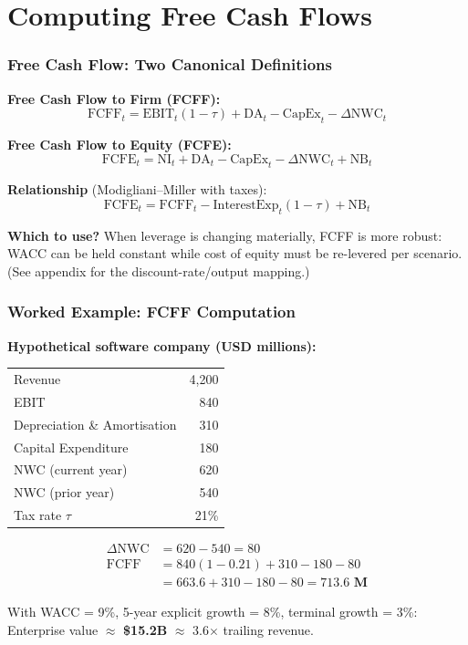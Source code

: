 \documentclass[9pt,t]{beamer}
\begin{document}
\section{Computing Free Cash Flows}

\begin{frame}
\frametitle{Free Cash Flow: Two Canonical Definitions}

\begin{underhood}
\textbf{Free Cash Flow to Firm (FCFF):}
\[
  \text{FCFF}_t = \text{EBIT}_t(1-\tau) + \text{DA}_t - \text{CapEx}_t - \Delta\text{NWC}_t
\]

\textbf{Free Cash Flow to Equity (FCFE):}
\[
  \text{FCFE}_t = \text{NI}_t + \text{DA}_t - \text{CapEx}_t - \Delta\text{NWC}_t + \text{NB}_t
\]

\textbf{Relationship} (Modigliani--Miller with taxes):
\[
  \text{FCFE}_t = \text{FCFF}_t - \text{InterestExp}_t(1-\tau) + \text{NB}_t
\]
\end{underhood}

\smallskip
\textbf{Which to use?} When leverage is changing materially, FCFF is more robust:
WACC can be held constant while cost of equity must be re-levered per scenario.
(See appendix for the discount-rate/output mapping.)
\end{frame}

\begin{frame}
\frametitle{Worked Example: FCFF Computation}

\textbf{Hypothetical software company (USD millions):}
\begin{center}
\begin{tabular}{lr}
\toprule
Revenue & 4{,}200 \\
EBIT & 840 \\
Depreciation \& Amortisation & 310 \\
Capital Expenditure & 180 \\
NWC (current year) & 620 \\
NWC (prior year) & 540 \\
Tax rate $\tau$ & 21\% \\
\bottomrule
\end{tabular}
\end{center}

\medskip
\begin{align*}
  \Delta\text{NWC} &= 620 - 540 = 80 \\
  \text{FCFF} &= 840(1-0.21) + 310 - 180 - 80 \\
              &= 663.6 + 310 - 180 - 80 = \mathbf{713.6\text{ M}}
\end{align*}

With WACC = 9\%, 5-year explicit growth = 8\%, terminal growth = 3\%:
Enterprise value $\approx$ \textbf{\$15.2B} $\approx$ 3.6$\times$ trailing revenue.
\end{frame}
\end{document}
